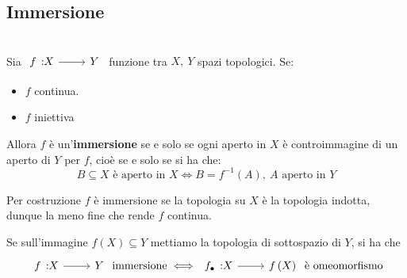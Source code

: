 	\subsection{Immersione} \label{immersione}
\begin{define}[Immersione.]~{}\\
Sia $\funz{f}{X}{Y}$ funzione tra $X,\ Y$ spazi topologici. Se:\begin{itemize}
\item $f$ continua.
\item $f$ iniettiva
\end{itemize}
Allora $f$ è un'\textbf{immersione} se e solo se ogni aperto in $X$ è controimmagine di un aperto di $Y$ per $f$, cioè se e solo se si ha che: 
\begin{equation}
B\subseteq X\text{ è aperto in }X\iff B=f^{-1}\left(A\right),\ A\text{ aperto in } Y
\end{equation}
\vspace{-6mm}
\end{define}
\begin{observe}\label{omeomorfismoimmersione}
\item Per costruzione $f$ è immersione se la topologia su $X$ è la topologia indotta, dunque la meno fine che rende $f$ continua.
\item Se sull'immagine $f\left(X\right)\subseteq Y$ mettiamo la topologia di sottospazio di $Y$, si ha che
\begin{equation*}
\funz{f}{X}{Y}\text{ immersione}\iff \funz{f_{\bullet}}{X}{f\left(X\right)}\text{ è omeomorfismo}
\end{equation*}
\vspace{-6mm}
\end{observe}
